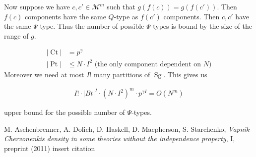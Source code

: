 \documentclass{amsart}
\newcommand{\M}{\mathcal M}
\DeclareMathOperator{\Sg}{Sg}
\DeclareMathOperator{\Pt}{Pt}
\DeclareMathOperator{\Ct}{Ct}
\begin{document}
Now suppose we have $c, c' \in \M^m$ such that $g(f(c)) = g(f(c'))$.
Then $f(c)$ components have the same $Q$-type as $f(c')$ components.
Then $c, c'$ have the same $\Psi$-type.
Thus the number of possible $\Psi$-types is bound by the size of the range of $g$.

\begin{align*}
	|\Ct| &= p^\gamma \\
	|\Pt| &\leq N \cdot I^2 \text { (the only component dependent on $N$)}
\end{align*}
Moreover we need at most $I!$ many partitions of $\Sg$. This gives us

\begin{align*}
	I! \cdot |Bt|^I \cdot (N \cdot I^2)^m \cdot p^{\gamma I} = O(N^m)
\end{align*}

upper bound for the possible number of $\Psi$-types.

\begin{thebibliography}{9}
		M. Aschenbrenner, A. Dolich, D. Haskell, D. Macpherson, S. Starchenko,
		\textit{Vapnik-Chervonenkis density in some theories without the independence property}, I, preprint (2011)
		insert citation
\end{thebibliography}
\end{document}
